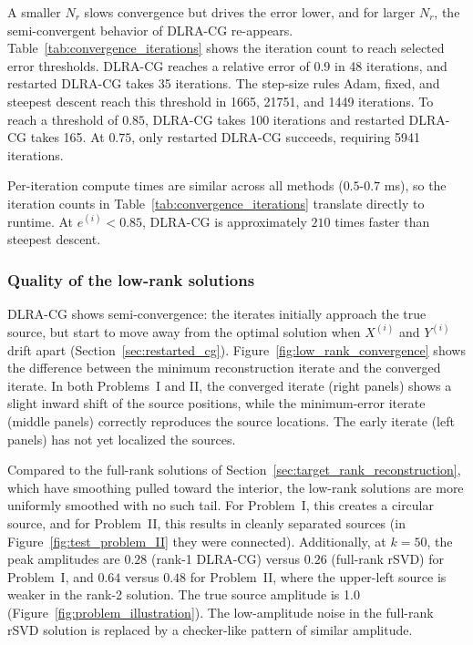 A smaller $N_r$ slows convergence but drives the error lower, and for larger $N_r$, the semi-convergent behavior of DLRA-CG re-appears. Table~\ref{tab:convergence_iterations} shows the iteration count to reach selected error thresholds. DLRA-CG reaches a relative error of $0.9$ in 48 iterations, and restarted DLRA-CG takes 35 iterations. The step-size rules Adam, fixed, and steepest descent reach this threshold in 1665, 21751, and 1449 iterations. To reach a threshold of $0.85$, DLRA-CG takes 100 iterations and restarted DLRA-CG takes 165. At $0.75$, only restarted DLRA-CG succeeds, requiring 5941 iterations.

Per-iteration compute times are similar across all methods ($0.5$-$0.7$ ms), so the iteration counts in Table~\ref{tab:convergence_iterations} translate directly to runtime. At $e^{(i)} < 0.85$, DLRA-CG is approximately $210$ times faster than steepest descent.


\subsubsection{Quality of the low-rank solutions}\label{sec:quality_of_the_low_rank_solutions}


DLRA-CG shows semi-convergence: the iterates initially approach the true source, but start to move away from the optimal solution when $X^{(i)}$ and $Y^{(i)}$ drift apart (Section~\ref{sec:restarted_cg}). Figure~\ref{fig:low_rank_convergence} shows the difference between the minimum reconstruction iterate and the converged iterate. In both Problems~I and II, the converged iterate (right panels) shows a slight inward shift of the source positions, while the minimum-error iterate (middle panels) correctly reproduces the source locations. The early iterate (left panels) has not yet localized the sources.

Compared to the full-rank solutions of Section~\ref{sec:target_rank_reconstruction}, which have smoothing pulled toward the interior, the low-rank solutions are more uniformly smoothed with no such tail. For Problem~I, this creates a circular source, and for Problem~II, this results in cleanly separated sources (in Figure~\ref{fig:test_problem_II} they were connected). Additionally, at $k = 50$, the peak amplitudes are $0.28$ (rank-1 DLRA-CG) versus $0.26$ (full-rank rSVD) for Problem~I, and $0.64$ versus $0.48$ for Problem~II, where the upper-left source is weaker in the rank-2 solution. The true source amplitude is 1.0 (Figure~\ref{fig:problem_illustration}). The low-amplitude noise in the full-rank rSVD solution is replaced by a checker-like pattern of similar amplitude.

